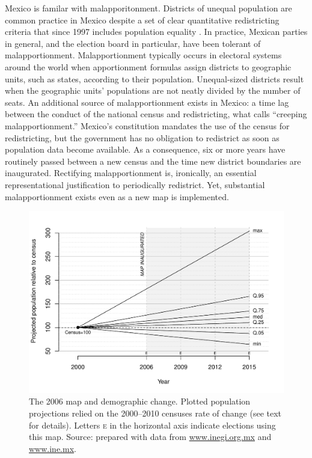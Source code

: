 \documentclass[letter,12pt]{article}
\begin{document}
Mexico is familar with malapporitonment. Districts of unequal population are common practice in Mexico despite a set of clear quantitative redistricting criteria that since 1997 includes population equality \citep{altman.magar.mcd.trelles2014apsa}. In practice, Mexican parties in general, and the election board in particular, have been tolerant of malapportionment. Malapportionment typically occurs in electoral systems around the world when apportionment formulas assign districts to geographic units, such as states, according to their population. Unequal-sized districts result when the geographic units' populations are not neatly divided by the number of seats. An additional source of malapportionment exists in Mexico: a time lag between the conduct of the national census and redistricting, what \citet{JohnstonCreepingMal} calls ``creeping malapportionment.'' Mexico's constitution mandates the use of the census for redistricting, but the government has no obligation to redistrict as soon as population data become available. As a consequence, six or more years have routinely passed between a new census and the time new district boundaries are inaugurated. Rectifying malapportionment is, ironically, an essential representational justification to periodically redistrict. Yet, substantial malapportionment exists  even as a new map is implemented. 

\begin{figure}
\centering 
  \includegraphics[width=.8\columnwidth]{disRelPopProj2006map.pdf} 
  \caption{The 2006 map and demographic change. Plotted population projections relied on the 2000--2010 censuses rate of change (see text for details). Letters \textsc{e} in the horizontal axis indicate elections using this map. Source: prepared with data from \url{www.inegi.org.mx} and \url{www.ine.mx}.}\label{F:disRelPop2006map}
\end{figure}
\end{document}
